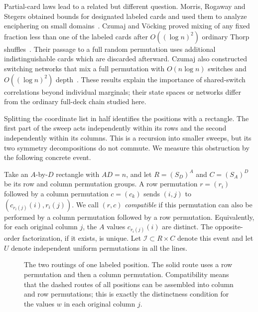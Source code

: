 Partial-card laws lead to a related but different question. Morris, Rogaway and Stegers obtained bounds for designated labeled cards and used them to analyze enciphering on small domains~\cite{mrs,MorrisRogawayStegers2018}. Czumaj and V\"ocking proved mixing of any fixed fraction less than one of the labeled cards after $O((\log n)^2)$ ordinary Thorp shuffles~\cite{CzumajVocking2014}. Their passage to a full random permutation uses additional indistinguishable cards which are discarded afterward. Czumaj also constructed switching networks that mix a full permutation with $O(n\log n)$ switches and $O((\log n)^2)$ depth~\cite{Czumaj2015}. These results explain the importance of shared-switch correlations beyond individual marginals; their state spaces or networks differ from the ordinary full-deck chain studied here.

Splitting the coordinate list in half identifies the positions with a rectangle. The first part of the sweep acts independently within its rows and the second independently within its columns. This is a recursion into smaller sweeps, but its two symmetry decompositions do not commute. We measure this obstruction by the following concrete event.

Take an $A$-by-$D$ rectangle with $AD=n$, and let $R=(S_D)^A$ and $C=(S_A)^D$ be its row and column permutation groups. A row permutation $r=(r_i)$ followed by a column permutation $c=(c_k)$ sends $(i,j)$ to $(c_{r_i(j)}(i),r_i(j))$. We call $(r,c)$ \emph{compatible} if this permutation can also be performed by a column permutation followed by a row permutation. Equivalently, for each original column $j$, the $A$ values $c_{r_i(j)}(i)$ are distinct. The opposite-order factorization, if it exists, is unique. Let $\mathcal I\subset R\times C$ denote this event and let $U$ denote independent uniform permutations in all the lines.

\begin{figure}[ht]
\centering

\caption{The two routings of one labeled position. The solid route uses a row permutation and then a column permutation. Compatibility means that the dashed routes of all positions can be assembled into column and row permutations; this is exactly the distinctness condition for the values $w$ in each original column $j$.}
\label{fig:compatibility}
\end{figure}

